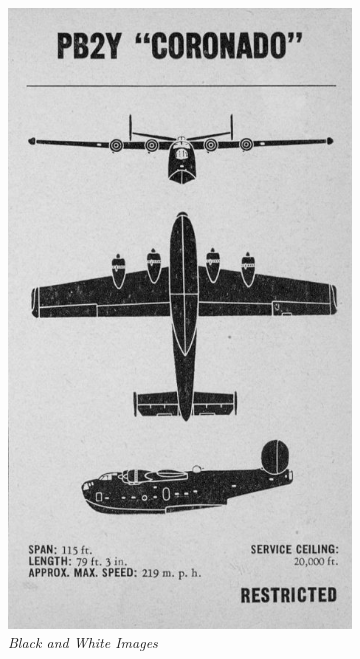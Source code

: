 \documentclass[paper=a4, fontsize=10pt]{scrartcl}	%
\begin{document}
	\begin{figure}[H]
		\begin{subfigure}{.5\textwidth}
			\centering
			\includegraphics[width=0.8\linewidth]{images/binarization/bw.jpeg}
			\caption{\textit{Black and White Images}}
			\label{fig:black-white}
		\end{subfigure}
		\begin{subfigure}{.5\textwidth}
			\centering

\end{subfigure}
\end{figure}
\end{document}
